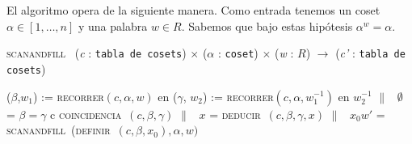 \documentclass[tesis.tex]{subfiles}
\newcommand{\coin}{\textsc{coincidencia}}
\newcommand{\definir}{\textsc{definir}}
\newcommand{\scanfill}{\textsc{scanandfill}}
\newcommand{\ded}{\textsc{deducir}}
\newcommand{\recorrer}{\textsc{recorrer}}
\begin{document}
El algoritmo opera de la siguiente manera.
Como entrada tenemos un coset $\alpha \in [1, \dots, n]$ y una palabra $w \in R$.
Sabemos que bajo estas hipótesis $\alpha^w = \alpha$.


\begin{algorithm}[H]
	\caption{\textsc{scanandfill} \ (\textit{c} : \texttt{tabla de cosets}) $\times $ (\textit{$\alpha$} : \texttt{coset}) $\times$ (\textit{w} : \texttt{$R$}) $\longrightarrow$ (\textit{c'} : \texttt{tabla de cosets})}
	\begin{algorithmic}[1]
		\State {} ($\beta$,$w_1$) := \recorrer$(c, \alpha, w)$ en
		\Indent
			\State {} ($\gamma$, $w_2$) :=  \recorrer$(c,\alpha, w_1^{-1})$ en
			\Indent
				\State {} $w_2^{-1}$ 
				\State $\|$ \ $\emptyset$ =  $\beta = \gamma$  c  \coin \ $(c, \beta, \gamma)$
				\State $\|$ \ $x$ = \ded \ $(c,\beta, \gamma, x)$
				\State $\|$ \ $x_0w'$ = \scanfill \  (\definir \ $(c, \beta, x_0), \alpha, w)$ 
			\EndIndent
		\EndIndent 
	\end{algorithmic}
\end{algorithm}
\end{document}
